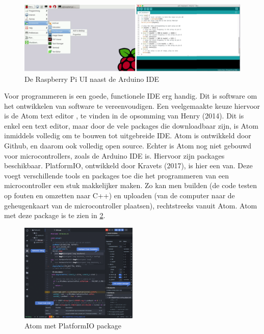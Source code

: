 \begin{figure}
\centering
\includegraphics[width=1\textwidth,height=\textheight]{img/rpi_ard.png}
\caption{De Raspberry Pi UI naast de Arduino IDE\label{fig:rpide}}
\end{figure}

Voor programmeren is een goede, functionele IDE erg handig. Dit is
software om het ontwikkelen van software te vereenvoudigen. Een
veelgemaakte keuze hiervoor is de Atom text editor , te vinden in de
opsomming van Henry (2014). Dit is enkel een text editor, maar door de
vele packages die downloadbaar zijn, is Atom inmiddels volledig om te
bouwen tot uitgebreide IDE. Atom is ontwikkeld door Github, en daarom
ook volledig open source. Echter is Atom nog niet gebouwd voor
microcontrollers, zoals de Arduino IDE is. Hiervoor zijn packages
beschikbaar. PlatformIO, ontwikkeld door Kravets (2017), is hier een
van. Deze voegt verschillende tools en packages toe die het programmeren
van een microcontroller een stuk makkelijker maken. Zo kan men builden
(de code testen op fouten en omzetten naar C++) en uploaden (van de
computer naar de geheugenkaart van de microcontroller plaatsen),
rechtstreeks vanuit Atom. Atom met deze package is te zien in
\cref{fig:atom}.

\begin{figure}
\centering
\includegraphics[width=0.5\textwidth,height=\textheight]{img/image_15.png}
\caption{Atom met PlatformIO package\label{fig:atom}}
\end{figure}

